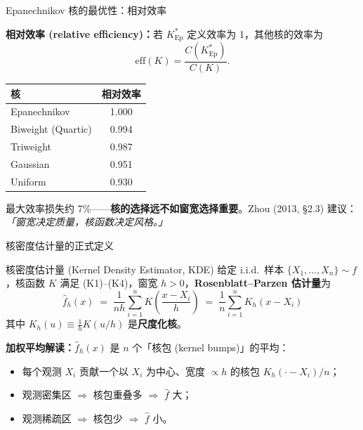 \documentclass[aspectratio=169, 10pt]{beamer}
\begin{document}
\begin{frame}{Epanechnikov 核的最优性：相对效率}

  \textbf{相对效率 (relative efficiency)：}若 $K^*_{\text{Ep}}$ 定义效率为 1，其他核的效率为
  \[
    \text{eff}(K) = \frac{C(K^*_{\text{Ep}})}{C(K)}.
  \]
  \small
  \begin{tabular}{@{}lc@{}}
    \toprule
    核                    & 相对效率 \\
    \midrule
    Epanechnikov          & 1.000 \\
    Biweight (Quartic)    & 0.994 \\
    Triweight             & 0.987 \\
    Gaussian              & 0.951 \\
    Uniform               & 0.930 \\
    \bottomrule
  \end{tabular}

  \begin{keybox}
    最大效率损失约 7\%——\textbf{核的选择远不如窗宽选择重要}。Zhou (2013, §2.3) 建议：
    \emph{「窗宽决定质量，核函数决定风格。」}
  \end{keybox}

\end{frame}


\begin{frame}{核密度估计量的正式定义}

  \begin{definitionbox}{{核密度估计量 (Kernel Density Estimator, KDE)}}
    给定 i.i.d.\ 样本 $\{X_1,\ldots,X_n\}\sim f$，核函数 $K$ 满足 (K1)--(K4)，窗宽 $h>0$，\textbf{Rosenblatt--Parzen 估计量}为
    \[
      \boxed{\;\hat f_h(x) \;=\; \frac{1}{nh}\sum_{i=1}^n K\!\left(\frac{x-X_i}{h}\right) \;=\; \frac{1}{n}\sum_{i=1}^n K_h(x-X_i)\;}
    \]
    其中 $K_h(u) \equiv \frac{1}{h}K(u/h)$ 是\textbf{尺度化核}。
  \end{definitionbox}

  \vspace{0.3em}

  \textbf{加权平均解读：}$\hat f_h(x)$ 是 $n$ 个「核包 (kernel bumps)」的平均：
  \begin{itemize}
    \item 每个观测 $X_i$ 贡献一个以 $X_i$ 为中心、宽度 $\propto h$ 的核包 $K_h(\cdot - X_i)/n$；
    \item 观测密集区 $\Rightarrow$ 核包重叠多 $\Rightarrow$ $\hat f$ 大；
    \item 观测稀疏区 $\Rightarrow$ 核包少 $\Rightarrow$ $\hat f$ 小。
  \end{itemize}

\end{frame}
\end{document}
